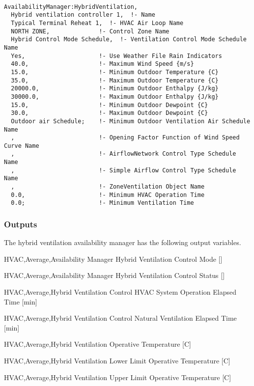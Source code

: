 \begin{lstlisting}

AvailabilityManager:HybridVentilation,
  Hybrid ventilation controller 1,  !- Name
  Typical Terminal Reheat 1,  !- HVAC Air Loop Name
  NORTH ZONE,              !- Control Zone Name
  Hybrid Control Mode Schedule,  !- Ventilation Control Mode Schedule Name
  Yes,                     !- Use Weather File Rain Indicators
  40.0,                    !- Maximum Wind Speed {m/s}
  15.0,                    !- Minimum Outdoor Temperature {C}
  35.0,                    !- Maximum Outdoor Temperature {C}
  20000.0,                 !- Minimum Outdoor Enthalpy {J/kg}
  30000.0,                 !- Maximum Outdoor Enthalpy {J/kg}
  15.0,                    !- Minimum Outdoor Dewpoint {C}
  30.0,                    !- Maximum Outdoor Dewpoint {C}
  Outdoor air Schedule;    !- Minimum Outdoor Ventilation Air Schedule Name
  ,                        !- Opening Factor Function of Wind Speed Curve Name
  ,                        !- AirflowNetwork Control Type Schedule Name
  ,                        !- Simple Airflow Control Type Schedule Name
  ,                        !- ZoneVentilation Object Name
  0.0,                     !- Minimum HVAC Operation Time
  0.0;                     !- Minimum Ventilation Time

\end{lstlisting}

\subsubsection{Outputs}\label{outputs-9-008}

The hybrid ventilation availability manager has the following output variables.

HVAC,Average,Availability Manager Hybrid Ventilation Control Mode {[]}

HVAC,Average,Availability Manager Hybrid Ventilation Control Status {[]}

HVAC,Average,Hybrid Ventilation Control HVAC System Operation Elapsed Time {[min]}

HVAC,Average,Hybrid Ventilation Control Natural Ventilation Elapsed Time {[min]}

HVAC,Average,Hybrid Ventilation Operative Temperature {[C]}

HVAC,Average,Hybrid Ventilation Lower Limit Operative Temperature {[C]}

HVAC,Average,Hybrid Ventilation Upper Limit Operative Temperature {[C]}

